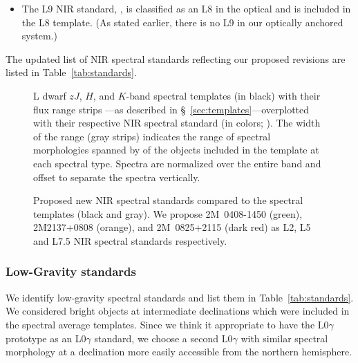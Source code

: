\documentclass[12pt]{aastex6}
\begin{document}
\begin{itemize}
	\item The L9 NIR standard, , is classified as an L8 in the optical and is included in the L8 template. (As stated earlier, there is no L9 in our optically anchored system.)

\end{itemize}

The updated list of NIR spectral standards reflecting our proposed revisions are listed in Table~\ref{tab:standards}.

\begin{figure}
        \caption{L dwarf $zJ$, $H$, and $K$-band spectral templates (in black) with their flux range strips ---as described in \S~\ref{sec:templates}---overplotted with their respective NIR spectral standard (in colors; \cite{Kirkpatrick10}).
    The width of the range (gray strips) indicates the range of spectral morphologies spanned by of the objects included in the template at each spectral type.
    Spectra are normalized over the entire band and offset to separate the spectra vertically.}
    \label{fig:templates-stds}
\end{figure}

\begin{figure}
        \caption{Proposed new NIR spectral standards compared to the spectral templates (black and gray).
        We propose 2M~0408-1450 (green), 2M2137+0808 (orange), and 2M~0825+2115 (dark red) as L2, L5 and L7.5 NIR spectral standards respectively.}
    \label{fig:templates-newstds}
\end{figure}

\subsubsection{Low-Gravity standards}

We identify low-gravity spectral standards and list them in Table~\ref{tab:standards}.
We considered bright objects at intermediate declinations which were included in the spectral average templates.
Since we think it appropriate to have the L0$\gamma$ prototype  as an L0$\gamma$ standard, we choose a second L0$\gamma$ with similar spectral morphology at a declination more easily accessible from the northern hemisphere.
\end{document}
